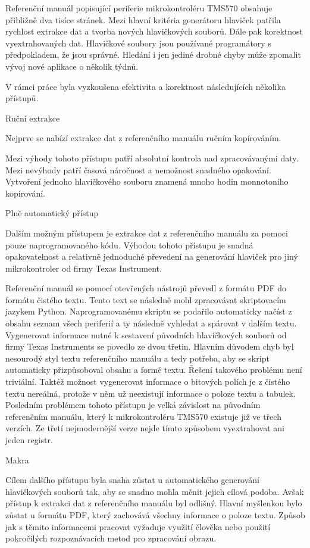 Referenční manuál popisující periferie mikrokontroléru TMS570 obsahuje přibližně dva tisíce stránek.
Mezi hlavní kritéria generátoru hlaviček patřila rychlost extrakce dat a tvorba nových hlavičkových souborů.
Dále pak korektnost vyextrahovaných dat.
Hlavičkové soubory jsou používané programátory s předpokladem, že jsou správné.
Hledání i jen jediné drobné chyby může zpomalit vývoj nové aplikace o několik týdnů.

V rámci práce byla vyzkoušena efektivita a korektnost následujících několika přístupů.

\secc Ruční extrakce

	Nejprve se nabízí extrakce dat z referenčního manuálu ručním kopírováním.

Mezi výhody tohoto přístupu patří absolutní kontrola nad zpracovávanými daty.
Mezi nevýhody patří časová náročnost a nemožnost snadného opakování.
Vytvoření jednoho hlavičkového souboru znamená mnoho hodin monnotoního kopírování.

\secc Plně automatický přístup

	Dalším možným přístupem je extrakce dat z referenčního manuálu za pomoci pouze naprogramovaného kódu.
Výhodou tohoto přístupu je snadná opakovatelnost a relativně jednoduché převedení na generování hlaviček pro jiný mikrokontroler od firmy Texas Instrument.

Referenční manuál se pomocí otevřených nástrojů převedl z formátu PDF do formátu čistého textu.
Tento text se následně mohl zpracovávat skriptovacím jazykem Python.
Naprogramovanému skriptu se podařilo automaticky načíst z obsahu seznam všech periferií a ty následně vyhledat a spárovat v dalším textu.
Vygenerovat informace nutné k sestavení původních hlavičkových souborů od firmy Texas Instruments se povedlo ze dvou třetin.
Hlavním důvodem chyb byl nesourodý styl textu referenčního manuálu a tedy potřeba, aby se skript automaticky přizpůsoboval obsahu a formě textu.
Řešení takového problému není triviální.
Taktéž možnost vygenerovat informace o bitových polích je z čistého textu nereálná, protože v něm už neexistují informace o poloze textu a tabulek.
Posledním problémem tohoto přístupu je velká závislost na původním referenčním manuálu, který k mikrokontroléru TMS570 existuje již ve třech verzích.
Ze třetí nejmodernější verze nejde tímto způsobem vyextrahovat ani jeden registr.

\secc Makra

	Cílem dalšího přístupu byla snaha zůstat u automatického generování hlavičkových souborů tak, aby se snadno mohla měnit jejich cílová podoba.
Avšak přístup k extrakci dat z referenčního manuálu byl odlišný.
Hlavní myšlenkou bylo zůstat u formátu PDF, který zachovává všechny informace o poloze textu.
Způsob jak s těmito informacemi pracovat vyžaduje využití člověka nebo použití pokročilých rozpoznávacích metod pro zpracování obrazu.

